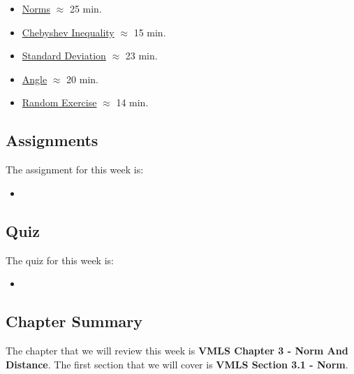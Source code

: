 \begin{itemize}
    \item \href{https://applied.cs.colorado.edu/mod/hvp/view.php?id=50692}{Norms} $\approx$ 25 min.
    \item \href{https://applied.cs.colorado.edu/mod/hvp/view.php?id=50693}{Chebyshev Inequality} $\approx$ 15 min.
    \item \href{https://applied.cs.colorado.edu/mod/hvp/view.php?id=50694}{Standard Deviation} $\approx$ 23 min.
    \item \href{https://applied.cs.colorado.edu/mod/hvp/view.php?id=50695}{Angle} $\approx$ 20 min.
    \item \href{https://applied.cs.colorado.edu/mod/hvp/view.php?id=50696}{Random Exercise} $\approx$ 14 min.
\end{itemize}

\subsection{Assignments}

The assignment for this week is:

\begin{itemize}
    \item {}
\end{itemize}

\subsection{Quiz}

The quiz for this week is:

\begin{itemize}
    \item {}
\end{itemize}

\subsection{Chapter Summary}

The chapter that we will review this week is \textbf{VMLS Chapter 3 - Norm And Distance}. The first section that we will cover is \textbf{VMLS Section 3.1 - Norm}.

